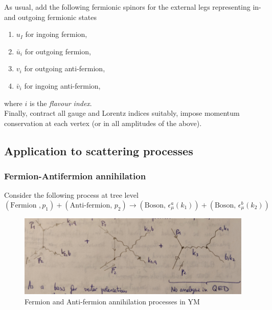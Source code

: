 As usual, add the following fermionic spinors for the external legs representing in- and outgoing fermionic states
\begin{enumerate}
	\item $u_I$ for ingoing fermion,
	\item $\bar{u}_i$ for outgoing fermion, 
	\item $v_i$ for outgoing anti-fermion,
	\item $\bar{v}_i$ for ingoing anti-fermion,
\end{enumerate}
where $i$ is the \emph{flavour index}.\\
Finally, contract all gauge and Lorentz indices suitably, impose momentum conservation at each vertex (or in all amplitudes of the above).













\subsection{Application to scattering processes}
\subsubsection{Fermion-Antifermion annihilation}
Consider the following process at tree level 
\begin{equation*}
	(\text{Fermion }, p_1)+(\text{Anti-fermion, }p_2) \rightarrow(\text{Boson, } \epsilon^a_\mu(k_1)) + (\text{Boson, }\epsilon^b_\mu(k_2)) 
\end{equation*}


\begin{figure}[h!]
	\centering
	\includegraphics[width=0.7\linewidth]{gfx/YMpictures/YMfermionantifermionAnnihilation}
	\caption{Fermion and Anti-fermion annihilation processes in YM}
	\label{fig:ymfermionantifermionannihilation}
\end{figure}


